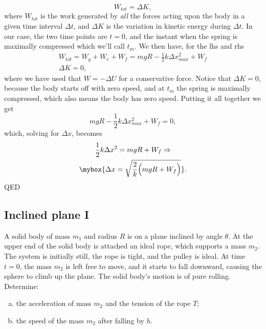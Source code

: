 \begin{description}
\begin{enumerate}[(a)]
        \begin{equation}
            \label{eq: kin_energy_th}
            W_{tot} = \Delta K,
        \end{equation}
        where $W_{tot}$ is the work generated by \emph{all} the forces acting upon the body in a given time interval $\Delta t$, and $ \Delta K $ is the variation in kinetic energy during $\Delta t$. In our case, the two time points are $t=0$, and the instant when the spring is maximally compressed which we'll call $t_m$. We then have, for the lhs and rhs
        \begin{gather*}
            W_{tot} = W_g + W_e + W_f = mgR - \frac{1}{2}k \Delta x_{max}^2 + W_f \\
            \Delta K = 0,
        \end{gather*}
        where we have used that $ W = -\Delta U $ for a conservative force. Notice that $\Delta K = 0$, because the body starts off with zero speed, and at $t_m$ the spring is maximally compressed, which also means the body has zero speed. Putting it all together we get
        \begin{equation}
            mgR - \frac{1}{2}k \Delta x_{max}^2 + W_f = 0,
        \end{equation}
        which, solving for $\Delta x$, becomes
        \begin{gather}
            \frac{1}{2}k \Delta x^2 = mgR + W_f \Rightarrow \notag \\
            \mybox{\Delta x = \sqrt{\frac{2}{k} \Bigl( mgR + W_f \Bigr)}}.
        \end{gather}
        QED
    \end{enumerate}  
\end{description}
\subsection{Inclined plane I}
\label{prob: inclined_plane_I}
A solid body of mass $m_1$ and radius $R$ is on a plane inclined by angle $\theta$. At the upper end of the solid body is attached an ideal rope, which supports a mass $m_2$. The system is initially still, the rope is tight, and the pulley is ideal. At time $t=0$, the mass $m_2$ is left free to move, and it starts to fall downward, causing the sphere to climb up the plane. The solid body's motion is of pure rolling. Determine:
\begin{enumerate}[(a)]
    \item the acceleration of mass $m_2$ and the tension of the rope $T$;
    \item the speed of the mass $m_2$ after falling by $h$.
\end{enumerate}

